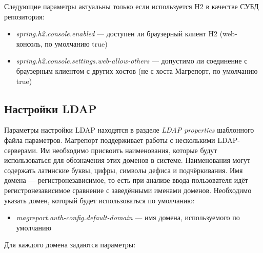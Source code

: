 \documentclass[../user-manual.tex]{subfiles}
\begin{document}
	Следующие параметры актуальны только если используется H2 в качестве СУБД репозитория:
	
	\begin{itemize}
		\item \textit{spring.h2.console.enabled} --- доступен ли браузерный клиент H2 (web-консоль, по умолчанию true)
		\item \textit{spring.h2.console.settings.web-allow-others} --- допустимо ли соединение с браузерным клиентом с других хостов (не с хоста Магрепорт, по умолчанию true)
	\end{itemize}
	
	\subsection{Настройки LDAP}
	
	Параметры настройки LDAP находятся в разделе \textit{LDAP properties} шаблонного файла параметров. Магрепорт поддерживает работы с несколькими LDAP-серверами. Им необходимо присвоить наименования, которые будут использоваться для обозначения этих доменов в системе. Наименования могут содержать латинские буквы, цифры, символы дефиса и подчёркивания. Имя домена --- регистронезависимое, то есть при анализе ввода пользователя идёт регистронезависимое сравнение с заведёнными именами доменов. Необходимо указать домен, который будет использоваться по умолчанию:
	
	\begin{itemize}
			\item \textit{magreport.auth-config.default-domain} --- имя домена, используемого по умолчанию
	\end{itemize}
	
	Для каждого домена задаются параметры:
	
\end{document}
